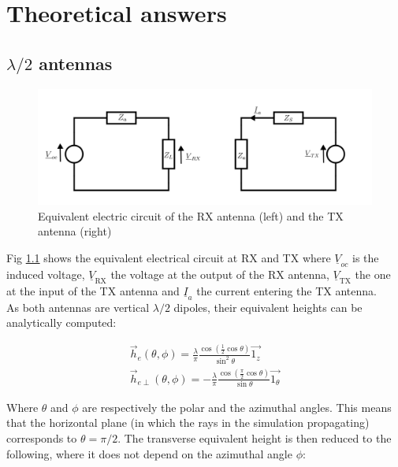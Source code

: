\documentclass[10pt,a4paper]{ULBreport}
\begin{document}
\chapter{Theoretical answers}

\section{$\lambda/2$ antennas}

\begin{figure}[H]
    \centering
    \includegraphics[width=1\textwidth]{circuit.png}
    \caption{Equivalent electric circuit of the RX antenna (left) and the TX antenna (right)}
    \label{fig:equivalent_electrical_circuit}
\end{figure}

Fig \ref{fig:equivalent_electrical_circuit} shows the equivalent electrical circuit at RX and TX where $\underline{V}_{oc}$ is the induced voltage, $\underline{V}_{\text{RX}}$ the voltage at the output of the RX antenna, $\underline{V}_{\text{TX}}$ the one at the input of the TX antenna and $\underline{I}_{a}$ the current entering the TX antenna.\\

As both antennas are vertical $\lambda/2$ dipoles, their equivalent heights can be analytically computed:
\vspace{-1cm}

\begin{align*}
    \vec{h}_e (\theta, \phi) = \frac{\lambda}{\pi} \frac{\cos\left(\frac{1}{2}\cos \theta\right)}{\sin ^2 \theta}\vec{1_z}\\
    \vec{h}_{e\perp} (\theta, \phi) = -\frac{\lambda}{\pi} \frac{\cos\left(\frac{\pi}{2}\cos \theta\right)}{\sin \theta}\vec{1_\theta}
\end{align*}

Where $\theta$ and $\phi$ are respectively the polar and the azimuthal angles. This means that the horizontal plane (in which the rays in the simulation propagating) corresponds to $\theta = \pi/2$. The transverse equivalent height is then reduced to the following, where it does not depend on the azimuthal angle $\phi$:
\end{document}
